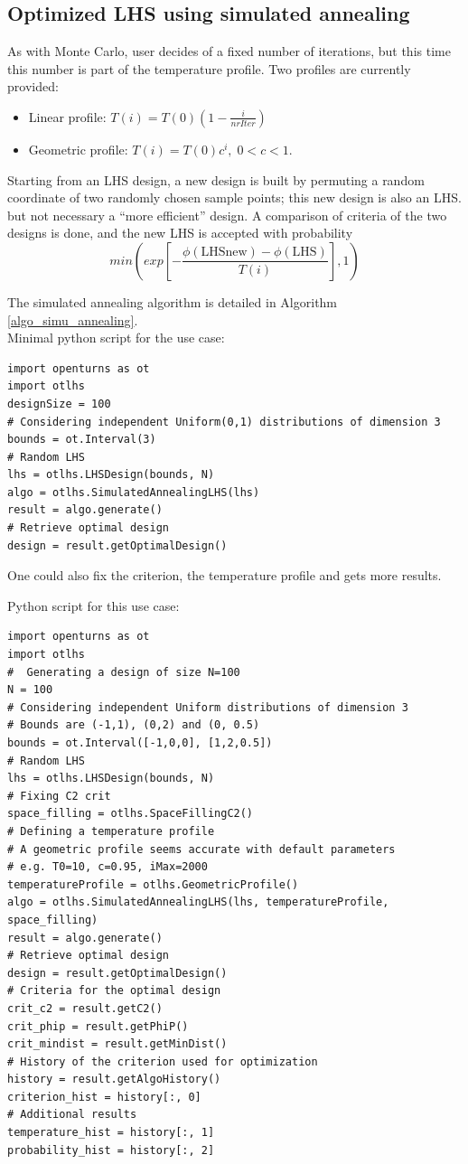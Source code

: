 \subsection{Optimized LHS using simulated annealing}
As with Monte Carlo, user decides of a fixed number of iterations, but this time this number is part of the temperature profile.  Two profiles are currently provided:
\begin{itemize}
\item Linear profile: $T(i) = T(0) \left( 1 - \frac{i}{nrIter} \right)$
\item Geometric profile: $T(i) = T(0) c^i,\; 0 < c < 1$.
\end{itemize}

Starting from an LHS design, a new design is built by permuting a random coordinate of two randomly chosen sample points; this new design is also an LHS. but not necessary a ``more efficient'' design.
A comparison of criteria of the two designs is done, and the new LHS is accepted with probability
\begin{equation*}
min\left(exp\left[ -\frac{ \phi(\text{LHSnew}) - \phi(\text{LHS})}{T(i)} \right], 1\right)
\end{equation*}

The simulated annealing algorithm is detailed in Algorithm \ref{algo_simu_annealing}.\\

Minimal python script for the use case:
\begin{lstlisting}
import openturns as ot
import otlhs
designSize = 100
# Considering independent Uniform(0,1) distributions of dimension 3
bounds = ot.Interval(3)
# Random LHS
lhs = otlhs.LHSDesign(bounds, N)
algo = otlhs.SimulatedAnnealingLHS(lhs)
result = algo.generate()
# Retrieve optimal design
design = result.getOptimalDesign()
\end{lstlisting}

One could also fix the criterion, the temperature profile and gets more results.

Python script for this use case:
\begin{lstlisting}
import openturns as ot
import otlhs
#  Generating a design of size N=100
N = 100
# Considering independent Uniform distributions of dimension 3
# Bounds are (-1,1), (0,2) and (0, 0.5)
bounds = ot.Interval([-1,0,0], [1,2,0.5])
# Random LHS
lhs = otlhs.LHSDesign(bounds, N)
# Fixing C2 crit
space_filling = otlhs.SpaceFillingC2()
# Defining a temperature profile
# A geometric profile seems accurate with default parameters
# e.g. T0=10, c=0.95, iMax=2000
temperatureProfile = otlhs.GeometricProfile()
algo = otlhs.SimulatedAnnealingLHS(lhs, temperatureProfile, space_filling)
result = algo.generate()
# Retrieve optimal design
design = result.getOptimalDesign()
# Criteria for the optimal design
crit_c2 = result.getC2()
crit_phip = result.getPhiP()
crit_mindist = result.getMinDist()
# History of the criterion used for optimization
history = result.getAlgoHistory()
criterion_hist = history[:, 0]
# Additional results
temperature_hist = history[:, 1]
probability_hist = history[:, 2]
\end{lstlisting}

